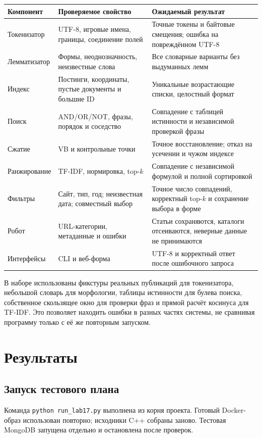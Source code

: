 \documentclass[12pt,a4paper]{article}
\begin{document}
\begin{center}
\small
\begin{tabular}{@{}p{29mm}>{\raggedright\arraybackslash}p{61mm}>{\raggedright\arraybackslash}p{52mm}@{}}
\toprule
Компонент & Проверяемое свойство & Ожидаемый результат\\
\midrule
Токенизатор & UTF-8, игровые имена, границы, соединение полей & Точные токены и байтовые смещения; ошибка на повреждённом UTF-8\\
Лемматизатор & Формы, неоднозначность, неизвестные слова & Все словарные варианты без выдуманных лемм\\
Индекс & Постинги, координаты, пустые документы и большие ID & Уникальные возрастающие списки, целостный формат\\
Поиск & AND/OR/NOT, фразы, порядок и соседство & Совпадение с таблицей истинности и независимой проверкой фразы\\
Сжатие & VB и контрольные точки & Точное восстановление; отказ на усечении и чужом индексе\\
Ранжирование & TF-IDF, нормировка, top-$k$ & Совпадение с независимой формулой и полной сортировкой\\
Фильтры & Сайт, тип, год; неизвестная дата; совместный выбор & Точное число совпадений, корректный top-$k$ и сохранение выбора в форме\\
Робот & URL-категории, метаданные и ошибки & Статьи сохраняются, каталоги отсеиваются, неверные данные не принимаются\\
Интерфейсы & CLI и веб-форма & UTF-8 и корректный ответ после ошибочного запроса\\
\bottomrule
\end{tabular}
\end{center}

В наборе использованы фикстуры реальных
публикаций для токенизатора, небольшой словарь для морфологии,
таблицы истинности для булева поиска, собственное скользящее окно
для проверки фраз и прямой расчёт косинуса для TF-IDF.
Это позволяет находить ошибки в разных частях системы, не сравнивая
программу только с её же повторным запуском.

\section{Результаты}
\subsection{Запуск тестового плана}
Команда \verb|python run_lab17.py| выполнена из корня проекта.
Готовый Docker-образ использован повторно; исходники C++ собраны заново.
Тестовая MongoDB запущена отдельно и остановлена после проверок.
\end{document}
